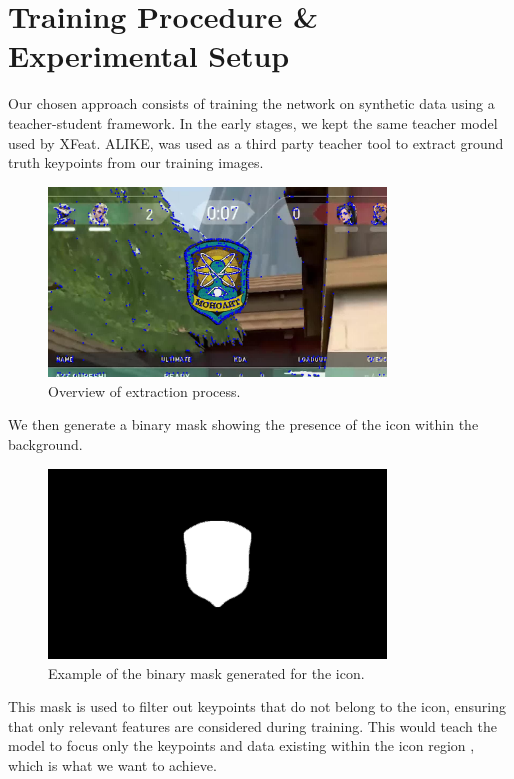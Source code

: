 \section{Training Procedure \& Experimental Setup}
Our chosen approach consists of training the network on synthetic data using a
teacher-student framework. In the early stages, we kept the same teacher model
used by XFeat\cite{xfeat2023}. ALIKE, was used as a third party teacher tool to
extract ground truth keypoints from our training images.
\begin{figure}[H]
    \centering
    \includegraphics[width=0.8\textwidth]{ressources/image1_keypoints.jpg}
    \caption{Overview of extraction process.}
    \label{fig:teacher_student}
\end{figure}
We then generate a binary mask showing the presence of the icon within the background.
\begin{figure}[H]
    \centering
    \includegraphics[width=0.8\textwidth]{ressources/mask_1.png}
    \caption{Example of the binary mask generated for the icon.}
    \label{fig:binary_mask}
\end{figure}
This mask is used to filter out keypoints that do not belong to the icon, ensuring that only relevant features are considered during training. This would teach the model to focus only the keypoints and data existing within the icon region , which is what we want to achieve.
